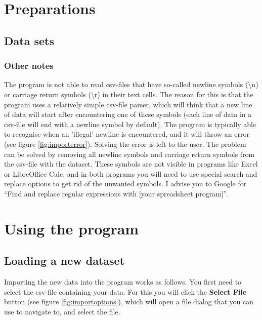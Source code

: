 \documentclass{memoir}
\begin{document}
\chapter{Preparations}
\label{chap:preparations}

\section{Data sets}
\label{sec:datasets}


\subsection{Other notes}
\label{sec:othernotesdatasets}

The program is not able to read csv-files that have so-called newline symbols (\textbackslash n) or carriage return symbols (\textbackslash r) in their text cells. The reason for this is that the program uses a relatively simple csv-file parser, which will think that a new line of data will start after encountering one of these symbols (each line of data in a csv-file will end with a newline symbol by default). The program is typically able to recognise when an 'illegal' newline is encountered, and it will throw an error (see figure \ref{fig:importerror}). Solving the error is left to the user. The problem can be solved by removing all newline symbols and carriage return symbols from the csv-file with the dataset. These symbols are not visible in programs like Excel or LibreOffice Calc, and in both programs you will need to use special search and replace options to get rid of the unwanted symbols. I advise you to Google for ``Find and replace regular expressions with [your spreadsheet program]''. 

\chapter{Using the program}
\label{chap:usingtheprogram}

\section{Loading a new dataset}
\label{sec:loadingnewdataset}

Importing the new data into the program works as follows. You first need to select the csv-file containing your data. For this you will click the \textbf{Select File} button (see figure \ref{fig:importoptions}), which will open a file dialog that you can use to navigate to, and select the file.
\end{document}
